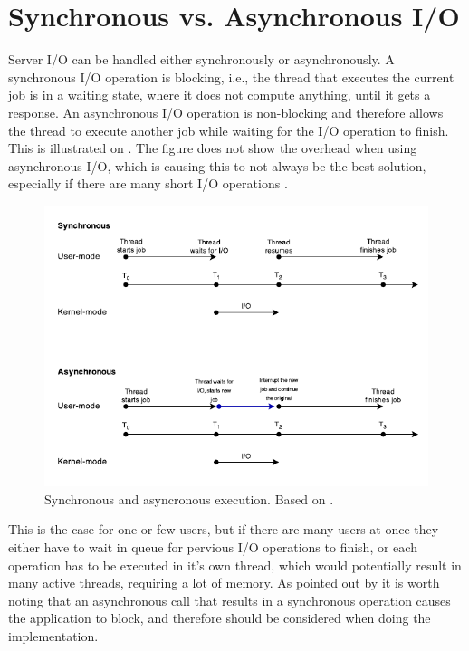 

\section{Synchronous vs. Asynchronous I/O}
Server I/O can be handled either synchronously or asynchronously. A synchronous I/O operation is blocking, i.e., the thread that executes the current job is in a waiting state, where it does not compute anything, until it gets a response. An asynchronous I/O operation is non-blocking and therefore allows the thread to execute another job while waiting for the I/O operation to finish. This is illustrated on . The figure does not show the overhead when using asynchronous I/O, which is causing this to not always be the best solution, especially if there are many short I/O operations \cite{ms-syn-asyn}.

\begin{figure}[H]
  \centering
  \includegraphics[scale=1.2]{billeder/sync-async.pdf}  
  \caption{Synchronous and asyncronous execution. Based on \cite{ms-syn-asyn}.}
  \label{fig:syncasync}
\end{figure}

This is the case for one or few users, but if there are many users at once they either have to wait in queue for pervious I/O operations to finish, or each operation has to be executed in it's own thread, which would potentially result in many active threads, requiring a lot of memory. As pointed out by \citet{amir} it is worth noting that an asynchronous call that results in a synchronous operation causes the application to block, and therefore should be considered when doing the implementation.

